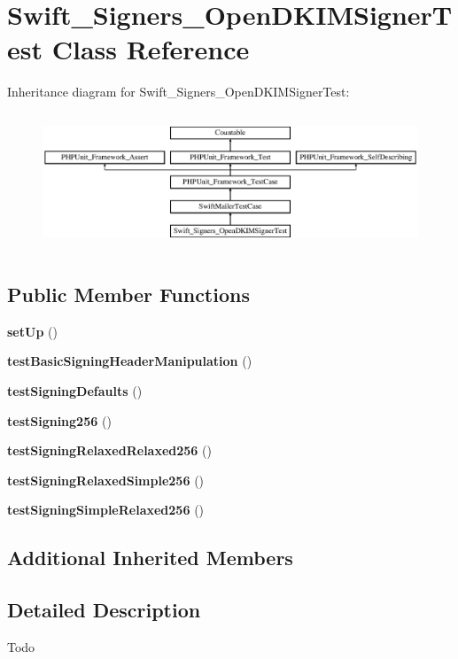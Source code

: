 \section{Swift\+\_\+\+Signers\+\_\+\+Open\+D\+K\+I\+M\+Signer\+Test Class Reference}
\label{class_swift___signers___open_d_k_i_m_signer_test}
Inheritance diagram for Swift\+\_\+\+Signers\+\_\+\+Open\+D\+K\+I\+M\+Signer\+Test\+:\begin{figure}[H]
\begin{center}
\leavevmode
\includegraphics[height=4.129793cm]{class_swift___signers___open_d_k_i_m_signer_test}
\end{center}
\end{figure}
\subsection*{Public Member Functions}
\begin{DoxyCompactItemize}
\item 
{\bf set\+Up} ()
\item 
{\bf test\+Basic\+Signing\+Header\+Manipulation} ()
\item 
{\bf test\+Signing\+Defaults} ()
\item 
{\bf test\+Signing256} ()
\item 
{\bf test\+Signing\+Relaxed\+Relaxed256} ()
\item 
{\bf test\+Signing\+Relaxed\+Simple256} ()
\item 
{\bf test\+Signing\+Simple\+Relaxed256} ()
\end{DoxyCompactItemize}
\subsection*{Additional Inherited Members}


\subsection{Detailed Description}
\begin{DoxyRefDesc}{Todo}
\item[{\bf Todo}]\end{DoxyRefDesc}


